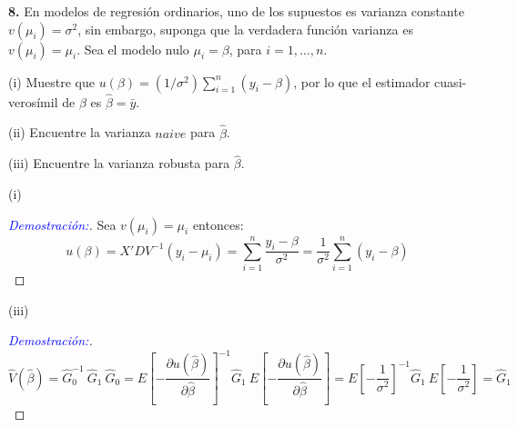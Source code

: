 \documentclass[12pt,a4paper,oneside]{article}
\begin{document}
 \noindent \textbf{8. } En modelos de regresión ordinarios, uno de los supuestos es varianza constante  $v(\mu_i)=\sigma^2$, sin embargo, suponga que la verdadera función varianza es $v(\mu_i)=\mu_i$. Sea el modelo nulo $\mu_i = \beta$, para $i=1,\dots,n$.\\
 
 \begin{compactenum}
 	\item[(i)]  Muestre que $u(\beta)= (1/\sigma^2) \sum_{i=1}^n (y_i - \beta)$, por lo que el estimador cuasi-verosímil de $\beta$ es $\hat \beta = \bar{y}$.
 	\item[(ii)] Encuentre la varianza $naive$ para $\hat \beta$.
 	\item[(iii)] Encuentre la varianza robusta para $\hat \beta$. 
 \end{compactenum}
 
 \begin{compactenum}
 	\item[(i)]\begin{proof}[\textcolor{blue}{Demostración:}] Sea $v(\mu_i)=\mu_i$ entonces:
 	$$u(\beta) = X' D V^{-1} (y_i - \mu_i) = \sum_{i=1}^n \frac{y_i - \beta}{\sigma^2} =  \frac{1}{\sigma^2} \sum_{i=1}^n (y_i - \beta)$$
 	\end{proof}
 	\item[(iii)]\begin{proof}[\textcolor{blue}{Demostración:}]
 	$$\widehat{V}(\widehat{\beta}) = \widehat{G}_0^{-1} \ \widehat{G}_1 \ \widehat{G}_0 = E \left[- \frac{\partial u(\widehat{\beta})}{\partial \widehat{\beta}} \right]^{-1} \widehat{G}_1 \ E \left[- \frac{\partial u(\widehat{\beta})}{\partial \widehat{\beta}} \right] = E\left[- \frac{1}{\sigma^2} \right]^{-1} \widehat{G}_1 \ E \left[-\frac{1}{\sigma^2} \right] = \widehat{G}_1$$
 	\end{proof}
 \end{compactenum}
\end{document}
